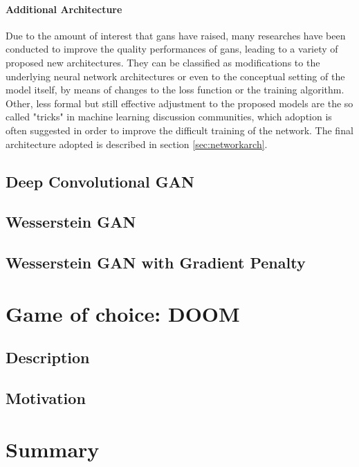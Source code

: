 \paragraph{Additional Architecture} Due to the amount of interest that \glspl{gan} have raised, many researches have been conducted to improve the quality performances of \glspl{gan}, leading to a variety of proposed new architectures. They can be classified as modifications to the underlying neural network architectures or even to the conceptual setting of the model itself, by means of changes to the loss function or the training algorithm. Other, less formal but still effective adjustment to the proposed models are the so called "tricks" in machine learning discussion communities, which adoption is often suggested in order to improve the difficult training of the network. The final architecture adopted is described in section \ref{sec:networkarch}.


\subsection{Deep Convolutional GAN}
\subsection{Wesserstein GAN}
\subsection{Wesserstein GAN with Gradient Penalty}


\section{Game of choice: DOOM}
\subsection{Description}
\subsection{Motivation}
\section{Summary}
